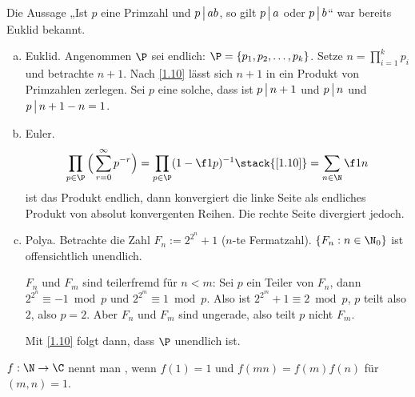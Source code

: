 \begin{nt*}
	Die Aussage „Ist $p$ eine Primzahl und $p \divs  ab$, so gilt $p \divs  a$ oder $p \divs  b$“ war bereits Euklid bekannt.
\end{nt*}

\begin{st}
	\begin{enumerate}[a)]
		\item
			Euklid.
			Angenommen $\P$ sei endlich: $\P = \{p_1, p_2, \dotsc, p_k\}$.
			Setze $n = \prod_{i=1}^k p_i$ und betrachte $n + 1$.
			Nach \ref{1.10} lässt sich $n +1$ in ein Produkt von Primzahlen zerlegen.
			Sei $p$ eine solche, dass ist $p \divs n + 1$ und $p \divs  n$ und $p \divs  n + 1 - n = 1$.
		\item
			Euler.
			\[
				\prod_{p\in \P} \Big( \sum_{r=0}^\infty p^{-r} \Big)
				= \prod_{p\in \P} (1 - \f 1p)^{-1}
				\stack{\ref{1.10}}= \sum_{n\in \N} \f 1n
			\]
			ist das Produkt endlich, dann konvergiert die linke Seite als endliches Produkt von absolut konvergenten Reihen.
			Die rechte Seite divergiert jedoch.
		\item
			Polya.
			Betrachte die Zahl $F_n := 2^{2^n} + 1$ ($n$-te Fermatzahl).
			$\{F_n : n \in \N_0\}$ ist offensichtlich unendlich.

			$F_n$ und $F_m$ sind teilerfremd für $n < m$:
			Sei $p$ ein Teiler von $F_n$, dann $2^{2^n} \equiv -1 \bmod p$ und $2^{2^m} \equiv 1 \bmod p$.
			Also ist $2^{2^m} + 1 \equiv 2 \bmod p$, $p$ teilt also $2$, also $p = 2$.
			Aber $F_n$ und $F_m$ sind ungerade, also teilt $p$ nicht $F_m$.

			Mit \ref{1.10} folgt dann, dass $\P$ unendlich ist.
	\end{enumerate}
\end{st}

\begin{df*}
	$f: \N \to \C$ nennt man , wenn $f(1) = 1$ und $f(m n) = f(m) f(n)$ für $(m,n) = 1$.
\end{df*}

